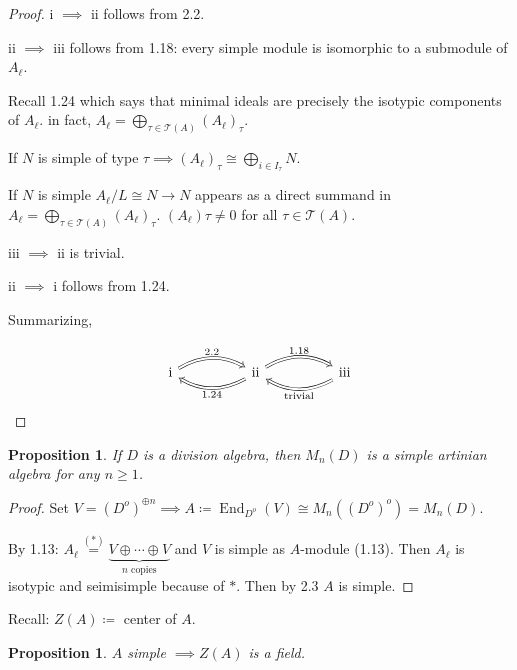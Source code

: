 \documentclass{article}
\theoremstyle{definition}
\theoremstyle{plain}
\newtheorem{proposition}[theorem]{Proposition}
\theoremstyle{remark}
\begin{document}
    \begin{proof}
        i \(\implies\) ii follows from 2.2.

        ii \(\implies\) iii follows from 1.18: every simple module is isomorphic to a submodule of \(A_\ell\).
        
        Recall 1.24 which says that minimal ideals are precisely the isotypic components of \(A_\ell\). in fact, \(A_\ell = \bigoplus_{\tau \in \mathcal{T}(A)} (A_\ell)_\tau\).
        
        If \(N\) is simple of type \(\tau \implies (A_\ell)_{\tau} \cong \bigoplus_{i\in I_\tau} N\).
        
        If \(N\) is simple \(A_\ell / L \cong N \to N\) appears as a direct summand in \(A_\ell = \bigoplus_{\tau \in \mathcal{T}(A)} (A_\ell)_{\tau}\). \((A_\ell)\tau \neq 0\) for all \(\tau \in \mathcal{T}(A)\).
        
        iii \(\implies\) ii is trivial.

        ii \(\implies\) i follows from 1.24.

        Summarizing,

        \[
            \begin{tikzcd}[column sep = huge]
                \text{i} \ar[r,Rightarrow, bend left, "2.2"] & \text{ii} \ar[r, Rightarrow, bend left, "1.18"] \ar[l, Rightarrow, bend left, "1.24"] & \text{iii} \ar[l, Rightarrow, bend left, "\text{trivial}"]
            \end{tikzcd}
        \]
    \end{proof}

    \begin{proposition}
        If \(D\) is a division algebra, then \(M_n (D)\) is a simple artinian algebra for any \(n \geq 1\).
    \end{proposition}

    \begin{proof}
        Set \(V = (D^o)^{\oplus n} \implies A \coloneqq \operatorname{End}_{D^o}(V) \cong M_n((D^o)^o) = M_n(D)\).

        By 1.13: \(A_\ell \overset{(\ast)}{=} \underbrace{V \oplus \cdots \oplus V}_{n \text{ copies}}\) and \(V\) is simple as \(A\)-module (1.13). Then \(A_\ell\) is isotypic and seimisimple because of \(\ast\). Then by 2.3 \(A\) is simple. 
    \end{proof}

    Recall: \(Z(A) \coloneqq\) center of \(A\).

    \begin{proposition}
        \(A\) simple \(\implies Z(A)\) is a field.
    \end{proposition}
\end{document}
